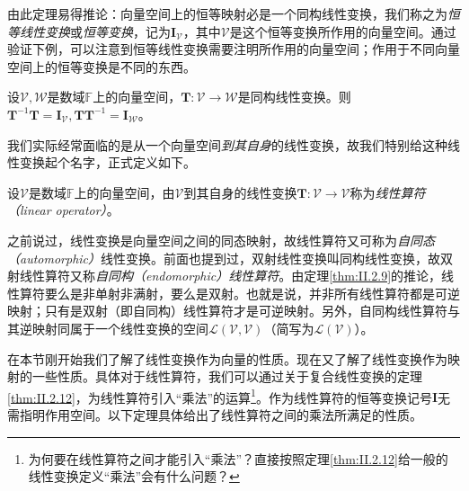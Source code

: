 \documentclass[main.tex]{subfiles}
\begin{document}
由此定理易得推论：向量空间上的恒等映射必是一个同构线性变换，我们称之为\emph{恒等线性变换}或\emph{恒等变换}，记为$\mathbf{I}_{\mathcal{V}}$，其中$\mathcal{V}$是这个恒等变换所作用的向量空间。通过验证下例，可以注意到恒等线性变换需要注明所作用的向量空间；作用于不同向量空间上的恒等变换是不同的东西。

\begin{example}
    设$\mathcal{V},\mathcal{W}$是数域$\mathbb{F}$上的向量空间，$\mathbf{T}:\mathcal{V}\rightarrow\mathcal{W}$是同构线性变换。则$\mathbf{T}^{-1}\mathbf{T}=\mathbf{I}_{\mathcal{V}},\mathbf{TT}^{-1}=\mathbf{I}_{\mathcal{W}}$。
\end{example}

我们实际经常面临的是从一个向量空间\emph{到其自身}的线性变换，故我们特别给这种线性变换起个名字，正式定义如下。

\begin{definition}[线性算符]\label{def:II.2.13}
    设$\mathcal{V}$是数域$\mathbb{F}$上的向量空间，由$\mathcal{V}$到其自身的线性变换$\mathbf{T}:\mathcal{V}\rightarrow\mathcal{V}$称为\emph{线性算符（linear operator）}。
\end{definition}

之前说过，线性变换是向量空间之间的同态映射，故线性算符又可称为\emph{自同态（automorphic）}线性变换。前面也提到过，双射线性变换叫同构线性变换，故双射线性算符又称\emph{自同构（endomorphic）线性算符}。由定理\ref{thm:II.2.9}的推论，线性算符要么是非单射非满射，要么是双射。也就是说，并非所有线性算符都是可逆映射；只有是双射（即自同构）线性算符才是可逆映射。另外，自同构线性算符与其逆映射同属于一个线性变换的空间$\mathcal{L}\left(\mathcal{V},\mathcal{V}\right)$（简写为$\mathcal{L}\left(\mathcal{V}\right)$）。

在本节刚开始我们了解了线性变换作为向量的性质。现在又了解了线性变换作为映射的一些性质。具体对于线性算符，我们可以通过关于复合线性变换的定理\ref{thm:II.2.12}，为线性算符引入“乘法”的运算\footnote{为何要在线性算符之间才能引入“乘法”？直接按照定理\ref{thm:II.2.12}给一般的线性变换定义“乘法”会有什么问题？}。作为线性算符的恒等变换记号$\mathbf{I}$无需指明作用空间。以下定理具体给出了线性算符之间的乘法所满足的性质。
\end{document}
